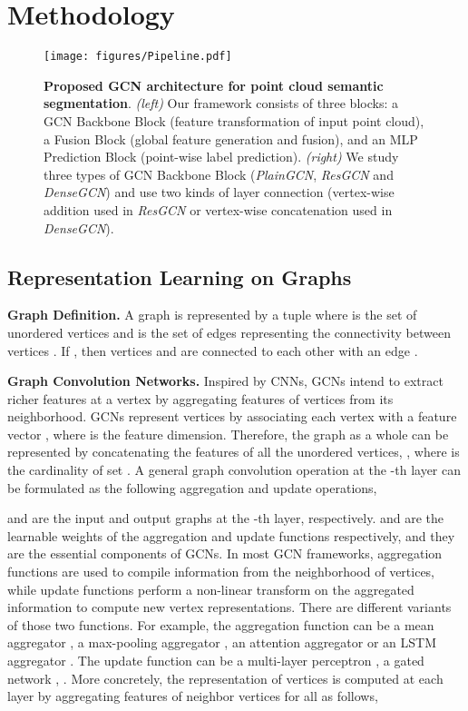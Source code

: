 \documentclass[10pt,twocolumn,letterpaper]{article}
\newcommand{\mysection}[1]{\vspace{3pt}\noindent\textbf{#1.}}
\begin{document}
\section{Methodology} 
\label{sec:methodology}

\begin{figure*}
    \centering
    \texttt{[image: figures/Pipeline.pdf]}
    \caption{\textbf{Proposed GCN  architecture for point cloud semantic segmentation}. \textit{(left)} Our framework consists of three blocks: a GCN Backbone Block (feature transformation of input point cloud), a Fusion Block (global feature generation and fusion), and an MLP Prediction Block (point-wise label prediction). \textit{(right)} We study three types of GCN Backbone Block (\emph{PlainGCN}, \emph{ResGCN} and \emph{DenseGCN}) and use two kinds of layer connection (vertex-wise addition used in \emph{ResGCN} or vertex-wise concatenation used in \emph{DenseGCN}). 
    }
\label{fig:pipeline}
\end{figure*}

\subsection{Representation Learning on Graphs} \label{sec:defineGCN}
\mysection{Graph Definition} A graph  is represented by a tuple  where  is the set of unordered vertices and  is the set of edges representing the connectivity between vertices . If , then vertices  and  are connected to each other with an edge .

\mysection{Graph Convolution Networks} Inspired by CNNs, GCNs intend to extract richer features at a vertex by aggregating features of vertices from its neighborhood. GCNs represent vertices by associating each vertex  with a feature vector ,
where  is the feature dimension. Therefore, the graph  as a whole can be represented by concatenating the features of all the unordered vertices, \ie ,
where  is the cardinality of set . A general graph convolution operation  at the -th layer can be formulated as the following aggregation and update operations,

 and  are the input and output graphs at the -th layer, respectively.   and  are the learnable weights of the aggregation and update functions respectively, and they are the essential components of GCNs. In most GCN frameworks, aggregation functions are used to compile information from the neighborhood of vertices, while update functions perform a non-linear transform on the aggregated information to compute new vertex representations. There are different variants of those two functions. For example, the aggregation function can be a mean aggregator \cite{kipf2016semi}, a max-pooling aggregator \cite{pc_qi2017pointnet,hamilton2017inductive,wang2018dynamic}, an attention aggregator \cite{velivckovic2017graph} or an LSTM aggregator \cite{peng2017cross}. The update function can be a multi-layer perceptron \cite{hamilton2017inductive,duvenaud2015convolutional}, a gated network \cite{li2015gated}, \etc. More concretely, the representation of vertices is computed at each layer by aggregating features of neighbor vertices for all  as follows,
\end{document}
